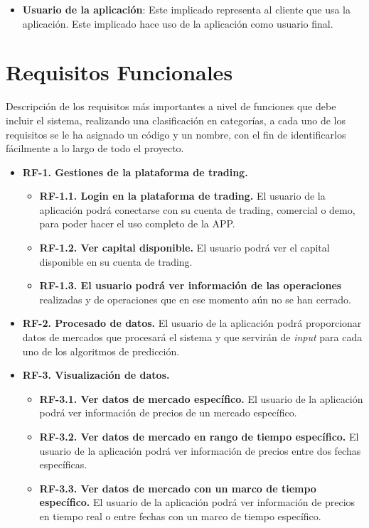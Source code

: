 \begin{titlepage}
\begin{itemize}
	\item \textbf{Usuario de la aplicación}: Este implicado representa al cliente que usa la aplicación. Este implicado hace uso de la aplicación como usuario final.
\end{itemize}

\section{Requisitos Funcionales}

Descripción de los requisitos más importantes a nivel de funciones que debe incluir el sistema, realizando una clasificación en categorías, a cada uno de los requisitos se le ha asignado un código y un nombre, con el fin de identificarlos fácilmente a lo largo de todo el proyecto. 

\begin{itemize}
	
	\item \textbf{RF-1. Gestiones de la plataforma de trading.} 
	\begin{itemize}
		\item \textbf{RF-1.1. Login en la plataforma de trading.} El usuario de la aplicación podrá conectarse con su cuenta de trading, comercial o demo, para poder hacer el uso completo de la APP.
		\item \textbf{RF-1.2. Ver capital disponible.} El usuario podrá ver el capital disponible en su cuenta de trading.
		\item \textbf{RF-1.3. El usuario podrá ver información de las operaciones} realizadas y de operaciones que en ese momento aún no se han cerrado.
	\end{itemize}

	\item \textbf{RF-2. Procesado de datos.} El usuario de la aplicación podrá proporcionar datos de mercados que procesará el sistema y que servirán de \textit{input} para cada uno de los algoritmos de predicción.

	\item \textbf{RF-3. Visualización de datos.}
	\begin{itemize}
		\item \textbf{RF-3.1. Ver datos de mercado específico.} El usuario de la aplicación podrá ver información de precios de un mercado específico.
		\item \textbf{RF-3.2. Ver datos de mercado en rango de tiempo específico.} El usuario de la aplicación podrá ver información de precios entre dos fechas específicas.
		\item \textbf{RF-3.3. Ver datos de mercado con un marco de tiempo específico.} El usuario de la aplicación podrá ver información de precios en tiempo real o entre fechas con un marco de tiempo específico.
	\end{itemize}


\end{itemize}
\end{titlepage}
